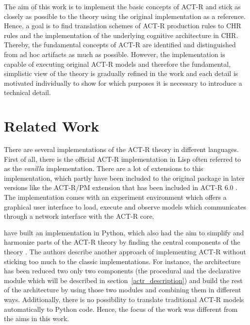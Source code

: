 The aim of this work is to implement the basic concepts of ACT-R and stick as closely as possible to the theory using the original implementation as a reference. Hence, a goal is to find translation schemes of ACT-R production rules to CHR rules and the implementation of the underlying cognitive architecture in CHR. Thereby, the fundamental concepts of ACT-R are identified and distinguished from ad hoc artifacts as much as possible. However, the implementation is capable of executing original ACT-R models and therefore the fundamental, simplistic view of the theory is gradually refined in the work and each detail is motivated individually to show for which purposes it is necessary to introduce a technical detail.


\section{Related Work}

There are several implementations of the ACT-R theory in different languages. First of all, there is the official ACT-R implementation in Lisp \cite{actr_homepage} often referred to as the \emph{vanilla} implementation. There are a lot of extensions to this implementation, which partly have been included to the original package in later versions like the ACT-R/PM extension that has been included in ACT-R 6.0 \cite[264]{actr_reference}. The implementation comes with an experiment environment which offers a graphical user interface to load, execute and observe models which communicates through a network interface with the ACT-R core.

\citeauthor{stewart_deconstructing_2007} have built an implementation in Python, which also had the aim to simplify and harmonize parts of the ACT-R theory by finding the central components of the theory \cites{stewart_deconstructing_2006,stewart_deconstructing_2007}. The authors describe another approach of implementing ACT-R without sticking too much to the classic implementations. For instance, the architecture has been reduced two only two components (the procedural and the declarative module which will be described in section~\ref{actr_description}) and build the rest of the architecture by using those two modules and combining them in different ways. Additionally, there is no possibility to translate traditional ACT-R models automatically to Python code. Hence, the focus of the work was different from the aims in this work.

